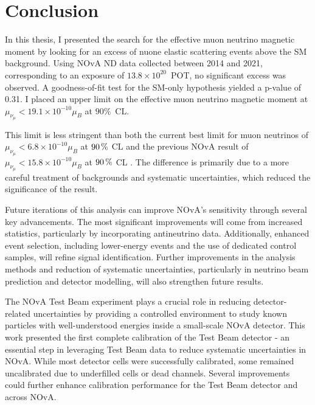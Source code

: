 \chapter{Conclusion}\label{sec:Conclusion}

In this thesis, I presented the search for the effective muon neutrino magnetic moment by looking for an excess of \gls{nuone} elastic scattering events above the \gls{SM} background. Using \gls{NOvA} \gls{ND} data collected between 2014 and 2021, corresponding to an exposure of $13.8\times10^{20}$~\gls{POT}, no significant excess was observed. A goodness-of-fit test for the \gls{SM}-only hypothesis yielded a p-value of 0.31. I placed an upper limit on the effective muon neutrino magnetic moment at $\mu_{\nu_\mu}<19.1\times 10^{-10}\mu_B$ at $90\%$~\gls{CL}.

This limit is less stringent than both the current best limit for muon neutrinos of $\mu_{\nu_\mu}<6.8\times 10^{-10}\mu_B$  at $\unit[90]{\%}$ \gls{CL} \cite{LSNDLimits2001.pdf} and the previous \gls{NOvA} result of \mbox{$\mu_{\nu_\mu}<15.8\times 10^{-10}\mu_B$} at $\unit[90]{\%}$ \gls{CL} \cite{nuMM-thesis-biaow.pdf}. The difference is primarily due to a more careful treatment of backgrounds and systematic uncertainties, which reduced the significance of the result.

Future iterations of this analysis can improve \gls{NOvA}’s sensitivity through several key advancements. The most significant improvements will come from increased statistics, particularly by incorporating antineutrino data. Additionally, enhanced event selection, including lower-energy events and the use of dedicated control samples, will refine signal identification. Further improvements in the analysis methods and reduction of systematic uncertainties, particularly in neutrino beam prediction and detector modelling, will also strengthen future results.

The \gls{NOvA} Test Beam experiment plays a crucial role in reducing detector-related uncertainties by providing a controlled environment to study known particles with well-understood energies inside a small-scale \gls{NOvA} detector. This work presented the first complete calibration of the Test Beam detector - an essential step in leveraging Test Beam data to reduce systematic uncertainties in \gls{NOvA}. While most detector cells were successfully calibrated, some remained uncalibrated due to underfilled cells or dead channels. Several improvements could further enhance calibration performance for the Test Beam detector and across \gls{NOvA}.

